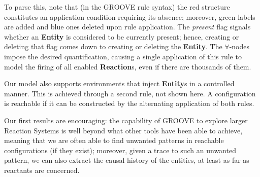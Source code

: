 \documentclass{llncs}
\newcommand{\lab}[1]{\textsf{#1}}
\newcommand{\blab}[1]{\lab{\bfseries #1}}
\newcommand{\ilab}[1]{\lab{\itshape #1}}
\begin{document}
To parse this, note that (in the GROOVE rule syntax) the red structure constitutes an application condition requiring its absence; moreover, green labels are added and blue ones deleted upon rule application. The \ilab{present} flag signals whether an \blab{Entity} is considered to be currently present; hence, creating or deleting that flag comes down to creating or deleting the \blab{Entity}. The $\forall$-nodes impose the desired quantification, causing a single application of this rule to model the firing of all enabled \blab{Reaction}s, even if there are thousands of them.

Our model also supports environments that inject \blab{Entity}s in a controlled manner. This is achieved through a second rule, not shown here. A configuration is reachable if it can be constructed by the alternating application of both rules.

\medskip\noindent
Our first results are encouraging: the capability of GROOVE to explore larger Reaction Systems is well beyond what other tools have been able to achieve, meaning that we are often able to find unwanted patterns in reachable configurations (if they exist); moreover, given a trace to such an unwanted pattern, we can also extract the causal history of the entities, at least as far as reactants are concerned.

%
%


%
\end{document}

